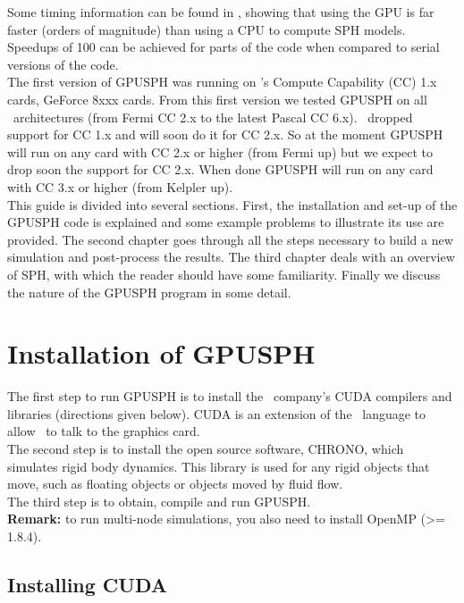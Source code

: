 \documentclass{../GPUSPHtemplate}
\begin{document}
Some timing information can be found in \cite{herault_sph_2010}, 
showing that using the GPU is far faster (orders
of magnitude) than using a CPU to compute SPH models. Speedups of 100
can be achieved for parts of the code when compared to serial versions
of the code.\\

The first version of GPUSPH was running  on \nvidia's Compute Capability (CC) 1.x cards, 
GeForce 8xxx cards. From this first version we tested GPUSPH on all \nvidia \  architectures
(from Fermi CC 2.x to the latest Pascal CC 6.x). \nvidia \  dropped support for CC 1.x and will 
soon do it for CC 2.x. So at the moment GPUSPH will run on any card with CC 2.x or higher
(from Fermi up) but we expect to drop soon the support for CC 2.x. When done GPUSPH will
run on any card with CC 3.x or higher (from Kelpler up).\\

This guide is divided into several sections. 
First, the installation and set-up of the GPUSPH code is explained and 
some example problems to illustrate its use are provided.
The second chapter goes through all the steps necessary to build a new
simulation and post-process the results.
The third chapter deals with an overview of SPH, with which the reader should
have some familiarity. 
Finally we discuss the nature of the GPUSPH program in some detail.

\section{Installation of GPUSPH}

The first step to run GPUSPH is to install the \nvidia\ company's CUDA
compilers and libraries (directions given below). CUDA is an extension
of the \cpp\ language to allow \cpp\ to talk to the graphics card.\\

The second step is to install the open source software, CHRONO,
which simulates rigid body dynamics. This library is used for
any rigid objects that move, such as floating objects or objects moved
by fluid flow.\\

The third step is to obtain, compile and run GPUSPH.\\

\textbf{Remark:} to run multi-node simulations, you also need to
install OpenMP (>= 1.8.4).

\subsection{Installing CUDA}
\end{document}
